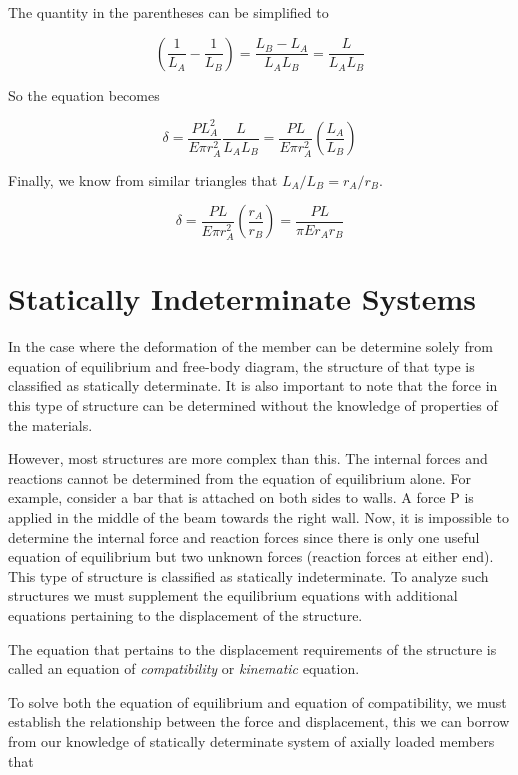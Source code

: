 \documentclass[
10pt,
a4paper,
openany,
svgnames,
]{book} %
\begin{document}
\begin{solution}
The quantity in the parentheses can be simplified to

\[\left( {\frac{1}{{{L_A}}} - \frac{1}{{{L_B}}}} \right) = \frac{{{L_B} - {L_A}}}{{{L_A}{L_B}}} = \frac{L}{{{L_A}{L_B}}}\]	

So the equation becomes

\[\delta  = \frac{{PL_A^2}}{{E\pi r_A^2}}\frac{L}{{{L_A}{L_B}}} = \frac{{PL}}{{E\pi r_A^2}}\left( {\frac{{{L_A}}}{{{L_B}}}} \right)\]	

Finally, we know from similar triangles that $L_A/L_B = r_A/r_B$.

\[\delta  = \frac{{PL}}{{E\pi r_A^2}}\left( {\frac{{{r_A}}}{{{r_B}}}} \right) = \frac{{PL}}{{\pi E{r_A}{r_B}}}\]

\end{solution}

\section{Statically Indeterminate Systems}

In the case where the deformation of the member can be determine solely from equation of equilibrium and free-body diagram, the structure of that type is classified as statically determinate. It is also important to note that the force in this type of structure can be determined without the knowledge of properties of the materials.

However, most structures are more complex than this. The internal forces and reactions cannot be determined from the equation of equilibrium alone. For example, consider a bar that is attached on both sides to walls. A force P is applied in the middle of the beam towards the right wall. Now, it is impossible to determine the internal force and reaction forces since there is only one useful equation of equilibrium but two unknown forces (reaction forces at either end). This type of structure is classified as statically indeterminate. To analyze such structures we must supplement the equilibrium equations with additional equations pertaining to the displacement of the structure.

The equation that pertains to the displacement requirements of the structure is called an equation of \emph{compatibility} or \emph{kinematic} equation.

To solve both the equation of equilibrium and equation of compatibility, we must establish the relationship between the force and displacement, this we can borrow from our knowledge of statically determinate system of axially loaded members that
	
\end{document}
